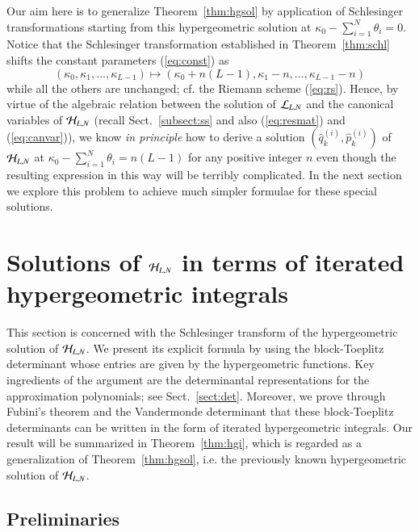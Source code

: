 \documentclass[12pt]{article}
\numberwithin{equation}{section}
\begin{document}
 
Our aim here is to generalize Theorem~\ref{thm:hgsol} by application of 
Schlesinger transformations starting from this hypergeometric solution
at $\kappa_0-\sum_{i=1}^N \theta_i=0$.
Notice that the Schlesinger transformation established in 
Theorem~\ref{thm:schl} 
shifts the constant parameters (\ref{eq:const})
as
\[
(\kappa_0, \kappa_1,\ldots, \kappa_{L-1})
\mapsto 
(\kappa_0+n(L-1), \kappa_1-n,\ldots, \kappa_{L-1}-n)
\]
while all the others are unchanged;
cf. the Riemann scheme (\ref{eq:rs}). 
Hence, by virtue of the algebraic relation
between the solution of ${\cal L}_{L,N}$
and the canonical variables of ${\cal H}_{L,N}$
(recall Sect.~\ref{subsect:ss} and also (\ref{eq:resmat}) and (\ref{eq:canvar})),
we know {\it in principle}
how to derive a solution 
$(\hat{q}_k^{(i)},\hat{p}_k^{(i)})$
of ${\cal H}_{L,N}$
at $\kappa_0-\sum_{i=1}^N \theta_i=n(L-1)$
for any positive integer $n$
even though the resulting expression in this way
will be terribly complicated.
In the next section
we explore this problem 
to achieve much simpler 
formulae for these special solutions.






\section{Solutions of  ${\cal H}_{L,N}$ in terms of
iterated hypergeometric integrals}
\label{sect:ihi}


This section is concerned with the Schlesinger transform of 
the hypergeometric solution of ${\cal H}_{L,N}$.
We present its explicit formula 
 by using the block-Toeplitz determinant whose entries are given by
the hypergeometric functions.
Key ingredients of the argument are 
the determinantal representations for the approximation polynomials;
see Sect.~\ref{sect:det}.
Moreover, we prove through Fubini's theorem and the Vandermonde determinant
that these block-Toeplitz determinants can be written
in the form of 
iterated hypergeometric integrals. 
Our result will be summarized in Theorem~\ref{thm:hgi},
which is regarded as a generalization of Theorem~\ref{thm:hgsol},
i.e. the previously known hypergeometric solution of ${\cal H}_{L,N}$.



\subsection{Preliminaries}
\label{subsect:prel}
\end{document}
